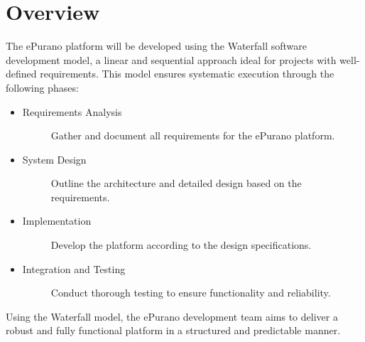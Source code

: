 \section{Overview}

The ePurano platform will be developed using the Waterfall software development model, a linear and sequential approach ideal for projects with well-defined requirements. This model ensures systematic execution through the following phases:

\begin{itemize}
    
    \item \begin{description}
        \item[Requirements Analysis] Gather and document all requirements for the ePurano platform.
    \end{description}
    \item \begin{description}
        \item[System Design] Outline the architecture and detailed design based on the requirements.
    \end{description}
    \item \begin{description}
        \item[Implementation] Develop the platform according to the design specifications.
    \end{description}
    \item \begin{description}
        \item[Integration and Testing] Conduct thorough testing to ensure functionality and reliability.
    \end{description}
\end{itemize}

Using the Waterfall model, the ePurano development team aims to deliver a robust and fully functional platform in a structured and predictable manner.